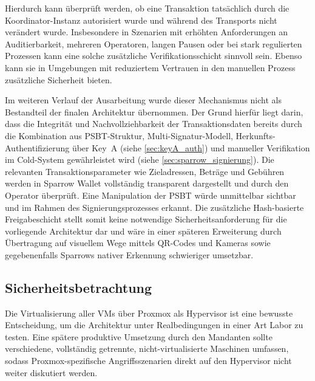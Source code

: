 Hierdurch kann überprüft werden, ob eine Transaktion tatsächlich durch die Koordinator-Instanz autorisiert wurde und während des Transports nicht verändert wurde.
Insbesondere in Szenarien mit erhöhten Anforderungen an Auditierbarkeit, mehreren Operatoren, langen Pausen oder bei stark regulierten Prozessen kann eine solche zusätzliche Verifikationsschicht sinnvoll sein. Ebenso kann sie in Umgebungen mit reduziertem Vertrauen in den manuellen Prozess zusätzliche Sicherheit bieten.

Im weiteren Verlauf der Ausarbeitung wurde dieser Mechanismus nicht als Bestandteil der finalen Architektur übernommen.
Der Grund hierfür liegt darin, dass die Integrität und Nachvollziehbarkeit der Transaktionsdaten bereits durch die Kombination aus \ac{PSBT}-Struktur, Multi-Signatur-Modell, Herkunfts-Authentifizierung über Key~A (siehe \ref{sec:keyA_auth}) und manueller Verifikation im Cold-System gewährleistet wird (siehe \ref{sec:sparrow_signierung}).
Die relevanten Transaktionsparameter wie Zieladressen, Beträge und Gebühren werden in Sparrow Wallet vollständig transparent dargestellt und durch den Operator überprüft. Eine Manipulation der \ac{PSBT} würde unmittelbar sichtbar und im Rahmen des Signierungsprozesses erkannt.
Die zusätzliche Hash-basierte Freigabeschicht stellt somit keine notwendige Sicherheitsanforderung für die vorliegende Architektur dar und wäre in einer späteren Erweiterung durch Übertragung auf visuellem Wege mittels \ac{QR}-Codes und Kameras sowie gegebenenfalls Sparrows nativer Erkennung schwieriger umsetzbar.

\subsection{Sicherheitsbetrachtung} \label{sec:sicherheitsbetrachtung}

Die Virtualisierung aller VMs über Proxmox als Hypervisor ist eine bewusste Entscheidung, um die Architektur unter Realbedingungen in einer Art Labor zu testen. Eine spätere produktive Umsetzung durch den Mandanten sollte verschiedene, vollständig getrennte, nicht-virtualisierte Maschinen umfassen, sodass Proxmox-spezifische Angriffsszenarien direkt auf den Hypervisor nicht weiter diskutiert werden.


